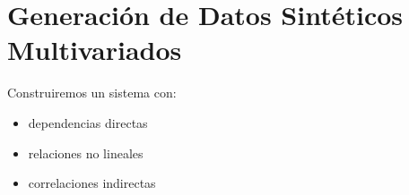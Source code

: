\documentclass[letterpaper,10pt,english]{jupyterBook}
\begin{document}
\section{Generación de Datos Sintéticos Multivariados}
\label{\detokenize{03_multivariate_models/high_dimensional:generacion-de-datos-sinteticos-multivariados}}
\sphinxAtStartPar
Construiremos un sistema con:
\begin{itemize}
\item {} 
\sphinxAtStartPar
dependencias directas

\item {} 
\sphinxAtStartPar
relaciones no lineales

\item {} 
\sphinxAtStartPar
correlaciones indirectas

\end{itemize}
\end{document}
